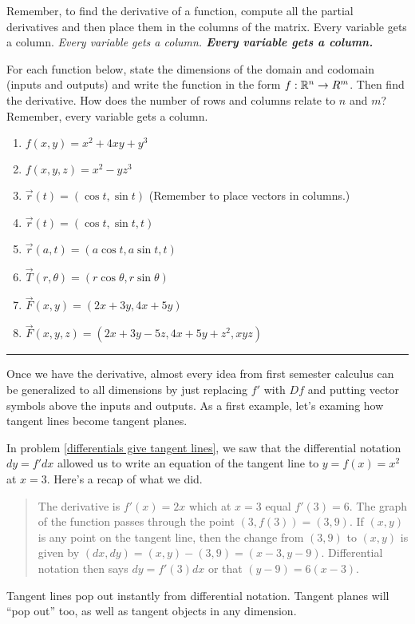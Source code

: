 Remember, to find the derivative of a function, compute all the partial derivatives and then place them in the columns of the matrix. Every variable gets a column. {\it Every variable gets a column. {\bf Every variable gets a column.}} 

\begin{problem}
 For each function below, state the dimensions of the domain and codomain (inputs and outputs) and write the function in the form $f:\mathbb{R}^n\to R^m$. Then find the derivative. How does the number of rows and columns relate to $n$ and $m$? Remember, every variable gets a column. 
\begin{enumerate}
 \item $f(x,y)=x^2+4xy+y^3$
 \item $f(x,y,z)=x^2-yz^3$
 \item $\vec r(t)=(\cos t, \sin t)$ (Remember to place vectors in columns.)
 \item $\vec r(t)=(\cos t, \sin t,t)$
 \item $\vec r(a,t)=(a\cos t, a\sin t,t)$
 \item $\vec T(r,\theta)=(r\cos \theta, r\sin \theta)$
 \item $\vec F(x,y)=(2x+3y,4x+5y)$
 \item $\vec F(x,y,z)=(2x+3y-5z,4x+5y+z^2, xyz)$
\end{enumerate}
\hrule\end{problem}

Once we have the derivative, almost every idea from first semester calculus can be generalized to all dimensions by just replacing $f'$ with $Df$ and putting vector symbols above the inputs and outputs. As a first example, let's examing how tangent lines become tangent planes.

\begin{remark}
  In problem \ref{differentials give tangent lines}, we saw that the differential notation $dy=f'dx$ allowed us to write an equation of the tangent line to $y=f(x)=x^2$ at $x=3$. Here's a recap of what we did.
\begin{quote} The derivative is $f'(x)=2x$ which at $x=3$ equal $f'(3)= 6$. The graph of the function passes through the point $(3,f(3)) = (3,9)$. If $(x,y)$ is any point on the tangent line, then the change from $(3,9)$ to $(x,y)$ is given by $(dx,dy)=(x,y)-(3,9)=(x-3,y-9)$.  Differential notation then says $dy=f'(3)dx$ or that $(y-9)=6(x-3)$.  
\end{quote}
Tangent lines pop out instantly from differential notation. Tangent planes will ``pop out'' too, as well as tangent objects in any dimension. 
\end{remark}


